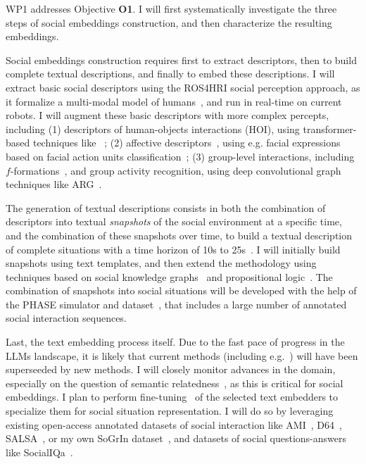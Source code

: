 WP1 addresses Objective \textbf{O1}. I will first systematically investigate the
three steps of social embeddings construction, and then characterize the
resulting embeddings.

Social embeddings construction requires first to extract descriptors, then to
build complete textual descriptions, and finally to embed these descriptions.  I
will extract basic social descriptors using the ROS4HRI social perception
approach, as it formalize a multi-modal model of humans~\cite{lemaignan2022ros},
and run in real-time on current robots. I will augment these basic descriptors
with more complex percepts, including (1) descriptors of human-objects
interactions (HOI), using transformer-based techniques
like~\cite{iftekhar2022what} ; (2) affective
descriptors~\cite{vinciarelli2009social}, using e.g. facial expressions based on
facial action units classification~\cite{martinez2019automatic}; (3) group-level
interactions, including $f$-formations~\cite{setti2015fformation}, and group
activity recognition, using deep convolutional graph techniques like
ARG~\cite{wu2019learning}.


The generation of textual descriptions consists in both the combination of
descriptors into textual \emph{snapshots} of the social environment at a
specific time, and the combination of these snapshots over time, to build a
textual description of complete situations with a time horizon of 10s to
25s~\cite{netanyahu2021phase}. I will initially build snapshots using text
templates, and then extend the methodology using techniques based on
social knowledge graphs~\cite{sap2019atomic} and propositional
logic~\cite{tsoi2022sean}. The combination of snapshots into social situations
will be developed with the help of the PHASE simulator and
dataset~\cite{netanyahu2021phase}, that includes a large number of annotated
social interaction sequences.

Last, the text embedding process itself. Due to the fast pace of progress in the
LLMs landscape, it is likely that current
methods (including e.g.~\cite{reimers2019sentencebert,muennighoff2022sgpt}) will
have been superseeded by new methods. I will closely monitor
advances in the domain, especially on the question of semantic
relatedness~\cite{thakur2021beir}, as this is critical for social
embeddings. I plan to perform fine-tuning~\cite{hadsell2006dimensionality}
of the selected text embedders to specialize them for social situation
representation. I will do so by leveraging existing open-access annotated
datasets of social interaction like AMI~\cite{carletta2007ami},
D64~\cite{oertel2013d64}, SALSA~\cite{alameda2015salsa}, or my own SoGrIn
dataset~\cite{webb2023sogrin}, and datasets of social questions-answers like
SocialIQa~\cite{sap2019social}.


